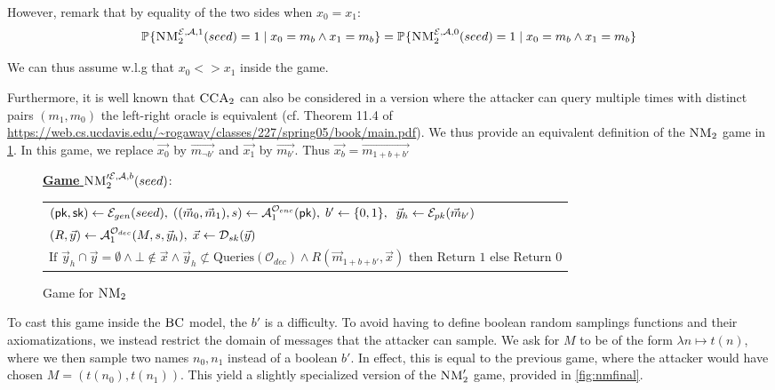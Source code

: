 However, remark that by equality of the two sides when $x_0=x_1$:
\[\mathbb{P}_{}\{\textsc{NM}_2^{\mathcal{E},\mathcal{A},1}(seed) = 1 \mid x_0 = m_b \wedge x_1 = m_b\} = \mathbb{P}_{}\{\textsc{NM}_2^{\mathcal{E},\mathcal{A},0}(seed) = 1  \mid x_0 = m_b \wedge x_1 = m_b\}   \]

We can thus assume w.l.g that $x_0 <> x_1$ inside the game.

Furthermore, it is well known that $\textsc{CCA}_2$ can also be considered in a version where the attacker can query multiple times with distinct pairs $(m_1,m_0)$ the left-right oracle is equivalent (cf. Theorem 11.4 of \url{https://web.cs.ucdavis.edu/~rogaway/classes/227/spring05/book/main.pdf}). We thus provide an equivalent definition of the $\textsc{NM}_2$ game in \cref{fig:nmbis}. In this game, we replace $\vec{x_0}$ by $\vec{m_{\neg b'}}$ and $\vec{x_1}$ by $\vec{m_{b'}}$. Thus $\vec{x_b} = \vec{m_{1+b+b'}}$


\begin{figure}[h!]
  \vspace{-1em}
  \centering

        \underline{\textbf{Game}
        $\textsc{NM}_2'^{\mathcal{E},\mathcal{A},b}(seed)$}: \\
        \begin{tabular}{l}
          $(\textsf{pk},\textsf{sk}) \leftarrow \mathcal{E}_{gen}(seed),\; ((\vec{m}_0,\vec{m}_1),s) \leftarrow \mathcal{A}_1^{\mathcal{O}_{enc}}(\textsf{pk}),\; b'\leftarrow \{0,1\},\;
  \; \vec{y}_h \leftarrow \mathcal{E}_{pk}(\vec{m}_{b'})$\\
          $(R,\vec{y}) \leftarrow \mathcal{A}_1^{\mathcal{O}_{dec}}(M,s,\vec{y}_h),\; \vec{x} \leftarrow \mathcal{D}_{sk}(\vec{y})$ \\
          $\text{If } \vec{y}_h \cap \vec{y} = \emptyset \wedge \bot \notin \vec{x} \wedge \vec{y}_h \not \subset \text{Queries}(\mathcal{O}_{dec}) \wedge R(\vec{m}_{1+b+b'},\vec{x}) \text{ then Return } 1 \text{ else Return } 0$
        \end{tabular}
  \caption{Game for $\textsc{NM}_2$}
  \label{fig:nmbis}
\end{figure}

To cast this game inside the $\textsc{BC}$ model, the $b'$ is a difficulty. To avoid having to define boolean random samplings functions and their axiomatizations, we instead restrict the domain of messages that the attacker can sample. We ask for $M$ to be of the form $\lambda n \mapsto t(n)$, where we then sample two names $n_0,n_1$ instead of a boolean $b'$. In effect, this is equal to the previous game, where the attacker would have chosen $M= ( t(n_0),t(n_1))$. This yield a slightly specialized version of the $\textsc{NM}_2'$ game,  provided in \cref{fig:nmfinal}.


